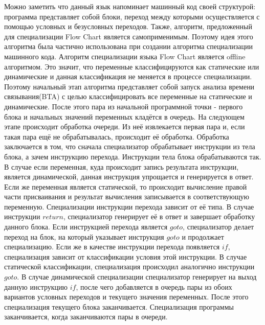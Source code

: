 Можно заметить что данный язык напоминает машинный код своей структурой: программа представляет собой блоки, переход между которыми осуществляется с помощью условных и безусловных переходов. Также, алгоритм, предложенный для специализации Flow Chart является самоприменимым. Поэтому идея этого алгоритма была частично использована при создании алгоритма специализации машинного кода. Алгоритм специализации языка Flow Chart является offline алгоритмом. Это значит, что переменные классифицируются как статические или динамические и данная классификация не меняется в процессе специализации. Поэтому начальный этап алгоритма представляет собой запуск анализа времени связывания(BTA) с целью классифицировать все переменные на статические и динамические. После этого пара из начальной программной точки - первого блока и начальных значений переменных кладётся в очередь. На следующем этапе происходит обработка очереди. Из неё извлекается первая пара и, если такая пара ещё не обрабатывалась, происходит её обработка. Обработка заключается в том, что сначала специализатор обрабатывает инструкции из тела блока, а зачем инструкцию перехода. Инструкции тела блока обрабатываются так. В случае если переменная, куда происходит запись результата инструкции, является динамической, данная инструкция упрощается и генерируется в ответ. Если же переменная является статической, то происходит вычисление правой части присваивания и результат вычисления записывается в соответствующую переменную. Специализации инструкции перехода зависит от её типа. В случае инструкции $return$, специализатор генерирует её в ответ и завершает обработку данного блока. Если инструкцией перехода является $goto$, специализатор делает переход на блок, на который указывает инструкция $goto$ и продолжает специализацию. Если же в качестве инструкции перехода появляется $if$, специализация зависит от классификации условия этой инструкции. В случае статической классификации, специализация происходил аналогично инструкции $goto$. В случае динамической специализации специализатор генерирует на выход данную инструкцию $if$, после чего добавляется в очередь пары из обоих вариантов условных переходов и текущего значения переменных. После этого специализация текущего блока заканчивается. Специализация программы заканчивается, когда заканчиваются пары в очереди. 
